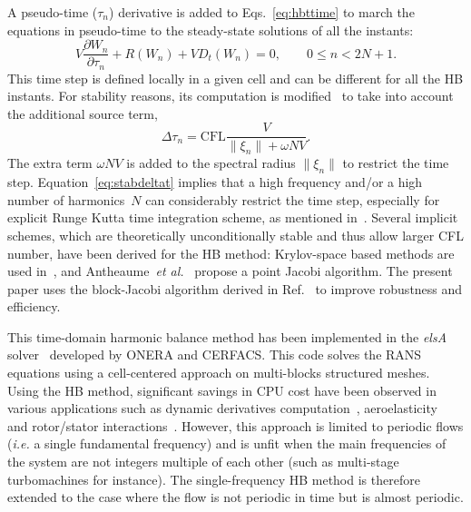 A pseudo-time ($\tau_n$) derivative is added to
Eqs.~\eqref{eq:hbttime} to march the equations in pseudo-time to the
steady-state solutions of all the instants:
\begin{equation}
  \label{eq:pseudohbttime}
  V\frac{\partial W_n}{\partial\tau_n} + R(W_n)+VD_t(W_n)=0, \quad \quad
  0 \leq n < 2N+1.
\end{equation}
This time step is defined locally in a given cell and can
  be different for all the HB instants. For stability reasons, its
computation is modified~\cite{Weide2005} to take into account
the additional source term,
\begin{equation}
  \label{eq:stabdeltat}
  \Delta\tau_n=\text{CFL}\frac{V}{\|\xi_n\|+\omega NV}.
\end{equation}
The extra term $\omega NV$ is added to the spectral radius $\|\xi_n\|$ to
restrict the time step.  Equation~\eqref{eq:stabdeltat} implies that a
high frequency and/or a high number of harmonics~$N$ can considerably
restrict the time step, especially for explicit Runge Kutta time
integration scheme, as mentioned in~\cite{Hall2002}. %
Several implicit schemes, which are theoretically unconditionally stable and thus allow larger
CFL number, have been derived for the HB method: Krylov-space based
methods are used
in~\cite{FLD:FLD2111,woodgate09:_implic_harmon_balan_solver_for}, and
Antheaume~\emph{et
  al.}~\cite{antheaume11:_implic_time_spect_method_for} propose a
point Jacobi algorithm. The present paper uses the block-Jacobi
algorithm derived in Ref.~\cite{Sicot2008} to improve robustness and
efficiency.

This time-domain harmonic balance method has been implemented in the
\emph{elsA} solver~\cite{cambier2012} developed by ONERA and
CERFACS. This code solves the RANS equations using a cell-centered
approach on multi-blocks structured meshes.  Using the HB method, significant savings in
CPU cost have been observed in various applications such as dynamic
derivatives computation~\cite{Hassan2011},
aeroelasticity~\cite{Dufour2010} and rotor/stator
interactions~\cite{Sicot2012}. However, this approach is limited to
periodic flows (\emph{i.e.} a single fundamental frequency) and is
unfit when the main frequencies of the system are not integers multiple
of each other (such as multi-stage turbomachines for instance). The single-frequency HB method is therefore
extended to the case where the flow is not periodic in time but is
almost periodic.

